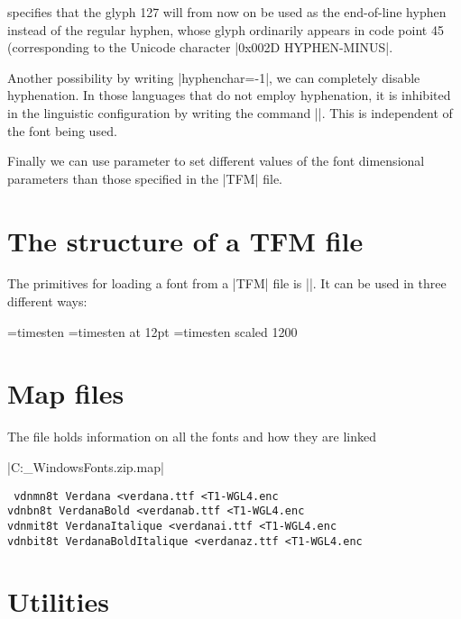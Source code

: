 \begin{multicols}{2}
\noindent specifies that the glyph 127 will from now on be used as the end-of-line hyphen instead of the regular hyphen, whose glyph ordinarily appears in code point 45 (corresponding to the Unicode character |0x002D HYPHEN-MINUS|.

Another possibility by writing |hyphenchar=-1|, we can completely disable hyphenation. In those languages that do not employ hyphenation, it is inhibited in the linguistic configuration by writing the command ||. This is independent of the font being used.


Finally we can use \tex {} parameter to set different values of the font dimensional parameters than those specified in the |TFM| file.

\begin{teX}
\end{teX}

\section{The structure of a TFM file}
The \tex primitives for loading a font from a |TFM| file is |\font|. It can be used in three different ways:

\begin{teX}
\font\myfontA=timesten
\font\myfontB=timesten at 12pt
\font\myfontC=timesten scaled 1200
\end{teX}


\section{Map files}
The file holds information on all the fonts and how they are linked

|C:\Users\user\AppData\Local\Temp{}_WindowsFonts.zip\WindowsFonts.map|

{\tt
vdnmn8t Verdana <verdana.ttf <T1-WGL4.enc\\
vdnbn8t VerdanaBold <verdanab.ttf <T1-WGL4.enc\\
vdnmit8t VerdanaItalique <verdanai.ttf <T1-WGL4.enc\\
vdnbit8t VerdanaBoldItalique <verdanaz.ttf <T1-WGL4.enc\\
}


\section{Utilities}

\end{multicols}
